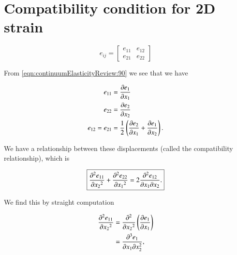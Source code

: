 % 
% 
% 
% 
% 
% 
% 
% 
% 
% 
% 
% 

\section{Compatibility condition for 2D strain}

\begin{equation}\label{eqn:continuumL6:50}
e_{ij} = 
\begin{bmatrix}
e_{11} & e_{12} \\
e_{21} & e_{22}
\end{bmatrix}
\end{equation}

From \ref{eqn:continuumElasticityReview:90} we see that we have

\begin{align}\label{eqn:continuumL6:70}
e_{11} &= \PD{x_1}{e_1} \\
e_{22} &= \PD{x_2}{e_2} \\
e_{12} = e_{21} &= 
\inv{2} \left( 
\PD{x_1}{e_2}
+ \PD{x_2}{e_1} 
\right).
\end{align}

We have a relationship between these displacements (called the compatibility relationship), which is

\begin{equation}\label{eqn:continuumL6:110}
\boxed{
\PDSq{x_2}{e_{11}} +
\PDSq{x_1}{e_{22}} = 
2
\frac{\partial^2 e_{12}}{\partial x_1 \partial x_2}.
}
\end{equation}

We find this by straight computation

\begin{align*}
\PDSq{x_2}{e_{11}} 
&= 
\PDSq{x_2}{}\left( 
\PD{x_1}{e_1}
\right) \\
&=
\frac{\partial^3 e_1}{\partial x_1 \partial x_2^2},
\end{align*}

